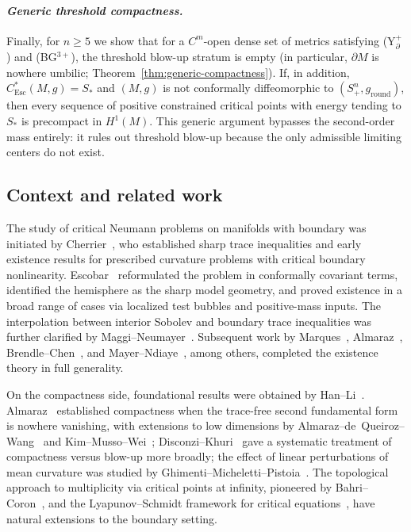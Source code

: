 \documentclass[11pt,reqno,a4paper]{amsart}
\numberwithin{equation}{section}
\theoremstyle{plain}
\newcommand{\Esc}{\ensuremath{\mathrm{Esc}}}
\theoremstyle{remark}
\theoremstyle{plain}
\begin{document}
\paragraph{\emph{Generic threshold compactness.}}
Finally, for $n\ge5$ we show that for a $C^m$-open dense set of metrics satisfying \textup{(Y$^+_{\partial}$)} and \textup{(BG$^{3+}$)},
the threshold blow-up stratum is empty
(in particular, $\partial M$ is nowhere umbilic; Theorem~\ref{thm:generic-compactness}).
If, in addition, $C^*_{\Esc}(M,g)=S_\ast$
and $(M,g)$ is not conformally diffeomorphic to $(S^n_+,g_{\mathrm{round}})$,
then every sequence of positive constrained critical points
with energy tending to $S_\ast$ is precompact in $H^1(M)$.
This generic argument bypasses the second-order mass entirely: it rules out threshold blow-up because
the only admissible limiting centers do not exist.

\subsection{Context and related work}  The study of critical Neumann problems on manifolds with boundary was initiated by Cherrier~\cite{Cherrier1984}, who established sharp trace inequalities and early existence results for prescribed curvature problems with critical boundary nonlinearity. Escobar~\cite{EscobarAnnals92,EscobarJDG92} reformulated the problem in conformally covariant terms, identified the hemisphere as the sharp model geometry, and proved existence in a broad range of cases via localized test bubbles and positive-mass inputs. The interpolation between interior Sobolev and boundary trace inequalities was further clarified by Maggi--Neumayer~\cite{MaggiNeumayer2017}. Subsequent work by Marques~\cite{Marques2005}, Almaraz~\cite{Almaraz2010}, Brendle--Chen~\cite{BrendleChenJEMS2014}, and Mayer--Ndiaye~\cite{MayerNdiaye2017JDG}, among others, completed the existence theory in full generality.

On the compactness side, foundational results were obtained by Han--Li~\cite{HanLi1999}. Almaraz~\cite{Almaraz2011CVPDE} established compactness when the trace-free second fundamental form is nowhere vanishing, with extensions to low dimensions by Almaraz--de~Queiroz--Wang~\cite{AlmarazQueirozWang2019JFA} and Kim--Musso--Wei~\cite{KimMussoWei2021}; Disconzi--Khuri~\cite{DisconziKhuri2017} gave a systematic treatment of compactness versus blow-up more broadly; the effect of linear perturbations of mean curvature was studied by Ghimenti--Micheletti--Pistoia~\cite{GhimentiMichelettiPistoia2018}. The topological approach to multiplicity via critical points at infinity, pioneered by Bahri--Coron~\cite{BahriCoron1988}, and the Lyapunov--Schmidt framework for critical equations~\cite{AmbrosettiMalchiodi2006}, have natural extensions to the boundary setting.
\end{document}
